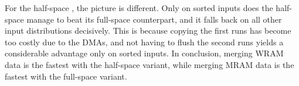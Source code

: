 For the half-space \MS{}, the picture is different.
Only on sorted inputs does the half-space \MS{} manage to beat its full-space counterpart, and it falls back on all other input distributions decisively.
This is because copying the first runs has become too costly due to the DMAs, and not having to flush the second runs yields a considerable advantage only on sorted inputs.
In conclusion, merging WRAM data is the fastest with the half-space variant, while merging MRAM data is the fastest with the full-space variant.
